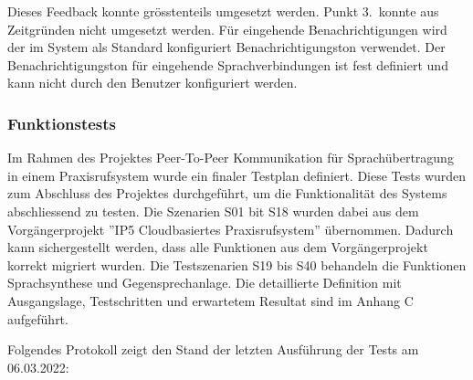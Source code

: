 Dieses Feedback konnte grösstenteils umgesetzt werden.
Punkt 3.\ konnte aus Zeitgründen nicht umgesetzt werden.
Für eingehende Benachrichtigungen wird der im System als Standard konfiguriert Benachrichtigungston verwendet.
Der Benachrichtigungston für eingehende Sprachverbindungen ist fest definiert und kann nicht durch den Benutzer konfiguriert werden.

\clearpage

\subsubsection{Funktionstests}

Im Rahmen des Projektes Peer-To-Peer Kommunikation für Sprachübertragung in einem Praxisrufsystem wurde ein finaler Testplan definiert.
Diese Tests wurden zum Abschluss des Projektes durchgeführt, um die Funktionalität des Systems abschliessend zu testen.
Die Szenarien S01 bit S18 wurden dabei aus dem Vorgängerprojekt ''IP5 Cloudbasiertes Praxisrufsystem'' übernommen.
Dadurch kann sichergestellt werden, dass alle Funktionen aus dem Vorgängerprojekt korrekt migriert wurden.
Die Testszenarien S19 bis S40 behandeln die Funktionen Sprachsynthese und Gegensprechanlage.
Die detaillierte Definition mit Ausgangslage, Testschritten und erwartetem Resultat sind im Anhang C aufgeführt.

Folgendes Protokoll zeigt den Stand der letzten Ausführung der Tests am 06.03.2022:

